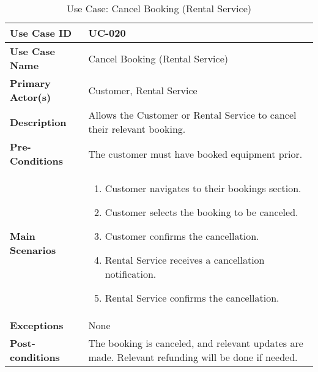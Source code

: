 \begin{table}[ht]
    \centering
    \begin{tabular}{|l|p{}|}
        \hline
        \textbf{Use Case ID} & UC-020 \\
        \hline
        \textbf{Use Case Name} & Cancel Booking (Rental Service) \\
        \hline
        \textbf{Primary Actor(s)} & Customer, Rental Service \\
        \hline
        \textbf{Description} & Allows the Customer or Rental Service to cancel their relevant booking. \\
        \hline
        \textbf{Pre-Conditions} & The customer must have booked equipment prior. \\
        \hline
        \textbf{Main Scenarios} & 
        \begin{enumerate}[label=\arabic*.,itemsep=0pt]
            \item Customer navigates to their bookings section.
            \item Customer selects the booking to be canceled.
            \item Customer confirms the cancellation.
            \item Rental Service receives a cancellation notification.
            \item Rental Service confirms the cancellation.
        \end{enumerate} \\
        \hline
        \textbf{Exceptions} & None \\
        \hline
        \textbf{Post-conditions} & The booking is canceled, and relevant updates are made. Relevant refunding will be done if needed. \\
        \hline
    \end{tabular}
    \label{tab:use-case-cancel-booking-rental-service}
    \caption{Use Case: Cancel Booking (Rental Service)}
\end{table}


